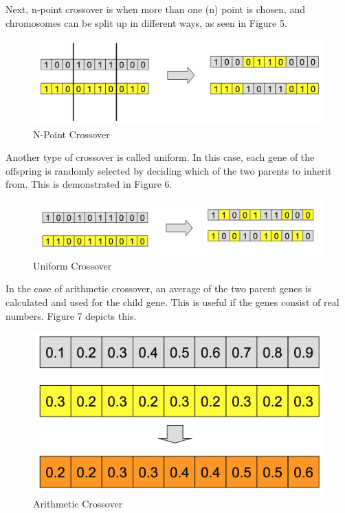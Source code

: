 \documentclass[12pt,a4paper]{article}
\begin{document}
Next, n-point crossover is when more than one (n) point is chosen, and chromosomes can be split up in different ways, as seen in Figure 5. 

\begin{figure}[h]
	\centering
	\includegraphics[width = \textwidth]{NPointCrossover.png}
	\caption{N-Point Crossover}
\end{figure}

Another type of crossover is called uniform. In this case, each gene of the offspring is randomly selected by deciding which of the two parents to inherit from. This is demonstrated in Figure 6.

\begin{figure}[h]
	\centering
	\includegraphics[width = \textwidth]{UniformCrossover.png}
	\caption{Uniform Crossover}
\end{figure}


In the case of arithmetic crossover, an average of the two parent genes is calculated and used for the child gene. This is useful if the genes consist of real numbers. Figure 7 depicts this.

\begin{figure}[h]
	\centering
	\includegraphics[width = \textwidth]{ArithmeticCrossover.png}
	\caption{Arithmetic Crossover}
\end{figure}
\end{document}
